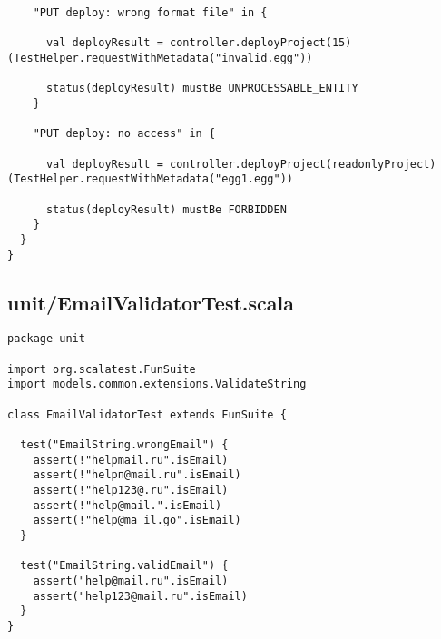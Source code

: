 \begin{lstlisting}
    "PUT deploy: wrong format file" in {

      val deployResult = controller.deployProject(15)(TestHelper.requestWithMetadata("invalid.egg"))

      status(deployResult) mustBe UNPROCESSABLE_ENTITY
    }

    "PUT deploy: no access" in {

      val deployResult = controller.deployProject(readonlyProject)(TestHelper.requestWithMetadata("egg1.egg"))

      status(deployResult) mustBe FORBIDDEN
    }
  }
}
\end{lstlisting}
\subsection{unit/EmailValidatorTest.scala}
\begin{lstlisting}
package unit

import org.scalatest.FunSuite
import models.common.extensions.ValidateString

class EmailValidatorTest extends FunSuite {

  test("EmailString.wrongEmail") {
    assert(!"helpmail.ru".isEmail)
    assert(!"helpп@mail.ru".isEmail)
    assert(!"help123@.ru".isEmail)
    assert(!"help@mail.".isEmail)
    assert(!"help@ma il.go".isEmail)
  }

  test("EmailString.validEmail") {
    assert("help@mail.ru".isEmail)
    assert("help123@mail.ru".isEmail)
  }
}
\end{lstlisting}
